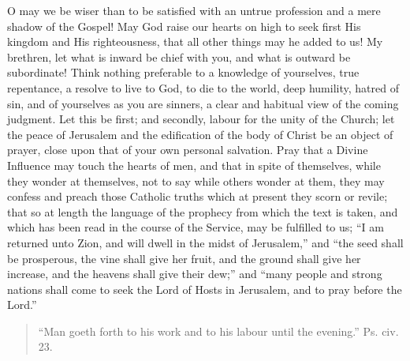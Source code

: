 O may we be wiser than to be satisfied with an untrue profession
and a mere shadow of the Gospel! May God raise our hearts on high to
seek first His kingdom and His righteousness, that all other things
may he added to us! My brethren, let what is inward be chief with you,
and what is outward be subordinate! Think nothing preferable to a
knowledge of yourselves, true repentance, a resolve to live to God, to
die to the world, deep humility, hatred of sin, and of yourselves as
you are sinners, a clear and habitual view of the coming judgment. Let
this be first; and secondly, labour for the unity of the Church; let
the peace of Jerusalem and the edification of the body of Christ be an
object of prayer, close upon that of your own personal salvation. Pray
that a Divine Influence may touch the hearts of men, and that in spite
of themselves, while they wonder at themselves, not to say while
others wonder at them, they may confess and preach those Catholic
truths which at present they scorn or revile; that so at length the
language of the prophecy from which the text is taken, and which has
been read in the course of the Service, may be fulfilled to us;
``I am returned unto Zion, and will dwell in the midst of
Jerusalem,'' and ``the seed shall be prosperous, the vine
shall give her fruit, and the ground shall give her increase, and the
heavens shall give their dew;'' and ``many people and strong
nations shall come to seek the Lord of Hosts in Jerusalem, and to pray
before the Lord.''


\begin{quote}

``Man goeth forth to his work and to his labour until the
evening.'' Ps. civ. 23.

\end{quote}

